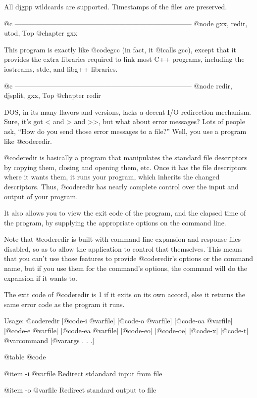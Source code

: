 All djgpp wildcards are supported.  Timestamps of the files are preserved.

@c -----------------------------------------------------------------------------
@node gxx, redir, utod, Top
@chapter gxx

This program is exactly like @code{gcc} (in fact, it @i{calls} gcc), except
that it provides the extra libraries required to link most C++ programs,
including the iostreams, stdc, and libg++ libraries.

@c -----------------------------------------------------------------------------
@node    redir, djsplit, gxx, Top
@chapter redir

DOS, in its many flavors and versions, lacks a decent I/O redirection
mechanism.  Sure, it's got < and > and >>, but what about error
messages?  Lots of people ask, ``How do you send those error messages
to a file?''  Well, you use a program like @code{redir}.

@code{redir} is basically a program that manipulates the standard file
descriptors by copying them, closing and opening them, etc.  Once it
has the file descriptors where it wants them, it runs your program,
which inherits the changed descriptors.  Thus, @code{redir} has nearly
complete control over the input and output of your program.

It also allows you to view the exit code of the program, and the
elapsed time of the program, by supplying the appropriate options on
the command line.

Note that @code{redir} is built with command-line expansion and response files
disabled, so as to allow the application to control that themselves.
This means that you can't use those features to provide @code{redir}'s options
or the command name, but if you use them for the command's options, the
command will do the expansion if it wants to.

The exit code of @code{redir} is 1 if it exits on its own accord, else it
returns the same error code as the program it runs.

Usage: @code{redir} [@code{-i} @var{file}] [@code{-o} @var{file}]
[@code{-oa} @var{file}] [@code{-e} @var{file}] [@code{-ea} @var{file}]
[@code{-eo}] [@code{-oe}] [@code{-x}] [@code{-t}] @var{command}
[@var{args} . . .]

@table @code

@item -i @var{file}
Redirect stdandard input from file

@item -o @var{file}
Redirect standard output to file

